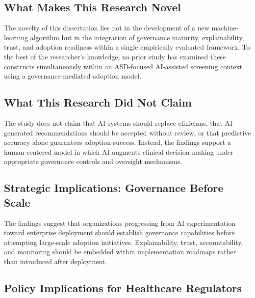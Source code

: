 
\subsection{What Makes This Research Novel}
\label{sec:what_makes_novel}

\noindent The novelty of this dissertation lies not in the development of a new machine-learning algorithm but in the integration of governance maturity, explainability, trust, and adoption readiness within a single empirically evaluated framework. To the best of the researcher's knowledge, no prior study has examined these constructs simultaneously within an ASD-focused AI-assisted screening context using a governance-mediated adoption model.


\subsection{What This Research Did Not Claim}
\label{sec:what_not_claimed}

\noindent The study does not claim that AI systems should replace clinicians, that AI-generated recommendations should be accepted without review, or that predictive accuracy alone guarantees adoption success. Instead, the findings support a human-centered model in which AI augments clinical decision-making under appropriate governance controls and oversight mechanisms.


\subsection{Strategic Implications: Governance Before Scale}
\label{sec:strategic_implications}

\noindent The findings suggest that organizations progressing from AI experimentation toward enterprise deployment should establish governance capabilities before attempting large-scale adoption initiatives. Explainability, trust, accountability, and monitoring should be embedded within implementation roadmaps rather than introduced after deployment.


\subsection{Policy Implications for Healthcare Regulators}
\label{sec:policy_implications}

